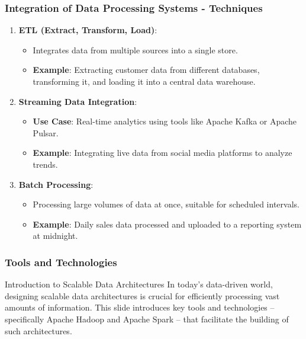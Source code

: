 \documentclass[aspectratio=169]{beamer}
\begin{document}
\begin{frame}[fragile]
    \frametitle{Integration of Data Processing Systems - Techniques}
    \begin{enumerate}
        \item \textbf{ETL (Extract, Transform, Load)}:
            \begin{itemize}
                \item Integrates data from multiple sources into a single store.
                \item \textbf{Example}: Extracting customer data from different databases, transforming it, and loading it into a central data warehouse.
            \end{itemize}
        
        \item \textbf{Streaming Data Integration}:
            \begin{itemize}
                \item \textbf{Use Case}: Real-time analytics using tools like Apache Kafka or Apache Pulsar.
                \item \textbf{Example}: Integrating live data from social media platforms to analyze trends.
            \end{itemize}
        
        \item \textbf{Batch Processing}:
            \begin{itemize}
                \item Processing large volumes of data at once, suitable for scheduled intervals.
                \item \textbf{Example}: Daily sales data processed and uploaded to a reporting system at midnight.
            \end{itemize}
    \end{enumerate}
\end{frame}

\begin{frame}[fragile]
    \frametitle{Tools and Technologies}
    \begin{block}{Introduction to Scalable Data Architectures}
        In today's data-driven world, designing scalable data architectures is crucial for efficiently processing vast amounts of information. This slide introduces key tools and technologies – specifically Apache Hadoop and Apache Spark – that facilitate the building of such architectures.
    \end{block}
\end{frame}
\end{document}
